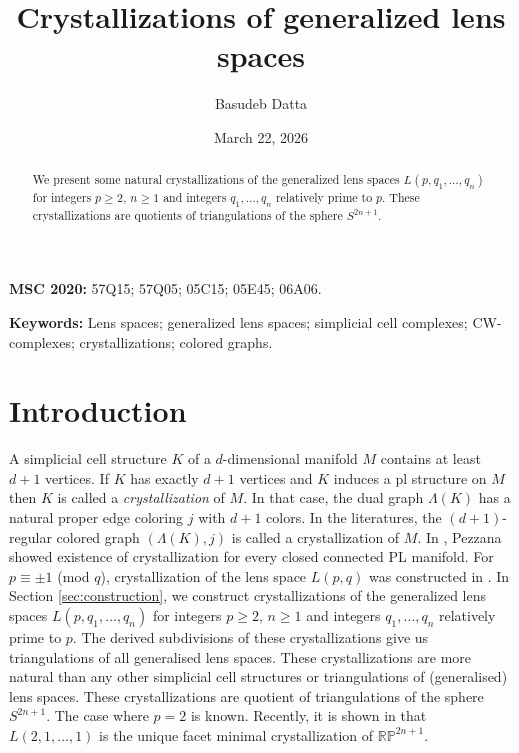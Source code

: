 \documentclass[12pt]{article}
\theoremstyle{theorem}
\theoremstyle{definition}
\begin{document}
\title{Crystallizations of generalized lens spaces}

\author{Basudeb Datta}


\date{March 22, 2026}

\maketitle

\vspace{-9mm}

\begin{abstract}
We present some natural crystallizations of the generalized lens spaces $L(p, q_1, \dots, q_n)$ for integers $p\geq 2$, $n\geq 1$ and integers $q_1, \dots, q_n$ relatively prime to $p$. These crystallizations are quotients of triangulations of the sphere $S^{2n+1}$. 
\end{abstract}


\noindent
\textbf{MSC 2020: }
57Q15; %
57Q05; %
05C15; %
05E45; %
06A06. %

\smallskip
\noindent
\textbf{Keywords:} Lens spaces; generalized lens spaces; simplicial cell complexes; CW-complexes; crystallizations; colored graphs. 
\section{Introduction}

A simplicial cell structure $K$ of a $d$-dimensional manifold $M$ contains at least $d+1$ vertices. If $K$ has exactly $d+1$ vertices and $K$ induces a pl structure on $M$ then $K$ is called a {\em crystallization} of $M$. In that case, the dual graph $\Lambda(K)$  has a natural proper edge coloring $j$ with $d+1$ colors. In the literatures, the $(d+1)$-regular colored graph $(\Lambda(K), j)$ is called a crystallization of $M$. In \cite{Pe74}, Pezzana showed existence of crystallization for every closed connected PL manifold.  For $p  \equiv \pm 1$ (mod $q$), crystallization of the lens space $L(p, q)$ was constructed in \cite{BD14}. In Section \ref{sec:construction}, we construct  crystallizations of the generalized lens spaces $L(p, q_1, \dots, q_n)$ for integers $p\geq 2$, $n\geq 1$ and integers $q_1, \dots, q_n$ relatively prime to $p$. The derived subdivisions of these crystallizations give us triangulations of all generalised lens spaces. These crystallizations are more natural than any other simplicial cell structures or triangulations of (generalised) lens spaces. 
These crystallizations are quotient of triangulations of the sphere $S^{2n+1}$. The case where $p=2$ is known. Recently, it is shown in \cite{AB26} that $L(2, 1, \dots, 1)$ is the unique facet minimal crystallization of $\mathbb{RP}^{2n+1}$. 
\end{document}
